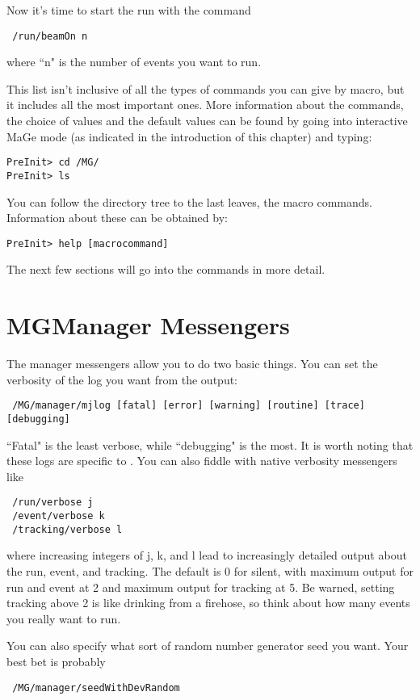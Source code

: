 \noindent Now it's time to start the run with the command

\begin{lstlisting}
 /run/beamOn n
\end{lstlisting}

\noindent where ``n" is the number of events you want to run.

This list isn't inclusive of all the types of commands you can give by macro,
but it includes all the most important ones. More information about the commands, the choice of values and the default values can be found by going into interactive MaGe mode (as indicated in the introduction of this chapter) and typing:
\begin{lstlisting}
PreInit> cd /MG/
PreInit> ls
\end{lstlisting}
You can follow the directory tree to the last leaves, the macro commands. Information about these can be obtained by:
\begin{lstlisting}
PreInit> help [macrocommand]
\end{lstlisting}
The next few sections will go into the commands in more detail.

\section{MGManager Messengers}

The manager messengers allow you to do two basic things.  You can set the
verbosity of the log you want from the output:
\begin{lstlisting}
 /MG/manager/mjlog [fatal] [error] [warning] [routine] [trace] [debugging]
\end{lstlisting}
\noindent ``Fatal" is the least verbose, while ``debugging" is the most.  It is
worth noting that these logs are specific to \mage.  You can also fiddle with
native \geant verbosity messengers like
\begin{lstlisting}
 /run/verbose j
 /event/verbose k
 /tracking/verbose l
\end{lstlisting}

\noindent where increasing integers of j, k, and l lead to increasingly detailed output
about the run, event, and tracking.  The default is 0 for silent, with maximum
output for run and event at 2 and maximum output for tracking at 5.  Be warned,
setting tracking above 2 is like drinking from a firehose, so think about how many
events you really want to run.

You can also specify what sort of random number generator seed you want.  Your
best bet is probably 
\begin{lstlisting}
 /MG/manager/seedWithDevRandom
\end{lstlisting}

